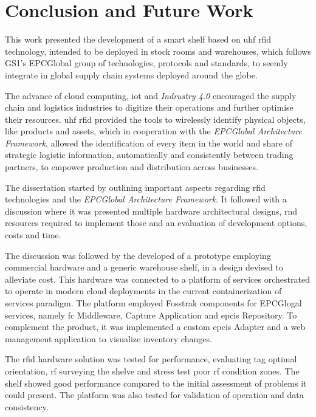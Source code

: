 \chapter{Conclusion and Future Work}


This work presented the development of a smart shelf based on \ac{uhf} \ac{rfid} technology, intended to be deployed in stock rooms and warehouses, which follows GS1's EPCGlobal group of technologies, protocols and standards, to seemly integrate in global supply chain systems deployed around the globe.

The advance of cloud computing, \ac{iot} and \emph{Indrustry 4.0} encouraged the supply chain and logistics industries to digitize their operations and further optimise their resources. 
\ac{uhf} \ac{rfid} provided the tools to wirelessly identify physical objects, like products and assets, which in cooperation with the \emph{EPCGlobal Architecture Framework}, allowed the identification of every item in the world and share of strategic logistic information, automatically and consistently between trading partners, to empower production and distribution across businesses.

The dissertation started by outlining important aspects regarding \ac{rfid} technologies and the \emph{EPCGlobal Architecture Framework}.
It followed with a discussion where it was presented multiple hardware architectural designs, \ac{rnd} resources required to implement those and an evaluation of development options, costs and time.

The discussion was followed by the developed of a prototype employing commercial hardware and a generic warehouse shelf, in a design devised to alleviate cost. This hardware was connected to a platform of services orchestrated to operate in modern cloud deployments in the current containerization of services paradigm. 
The platform employed Fosstrak components for EPCGlogal services, namely \ac{fc} Middleware, Capture Application and \ac{epcis} Repository. 
To complement the product, it was implemented a custom \ac{epcis} Adapter and a web management application to visualize inventory changes.

The \ac{rfid} hardware solution was tested for performance, evaluating tag optimal orientation, \ac{rf} surveying the shelve and stress test poor \ac{rf} condition zones. The shelf showed good performance compared to the initial assessment of problems it could present.
The platform was also tested for validation of operation and data consistency.

